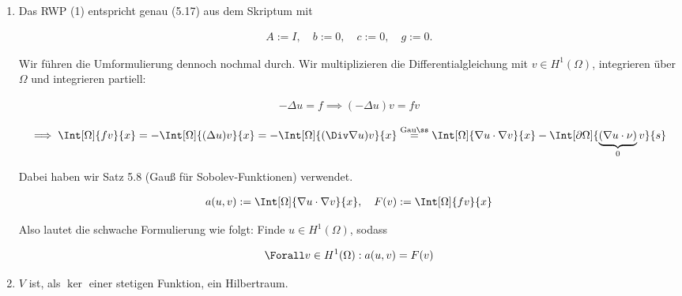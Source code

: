 \begin{solution}

\phantom{}

\begin{enumerate}[label = \alph*)]

    \item Das RWP (1) entspricht genau (5.17) aus dem Skriptum mit

    \begin{align*}
        A := I, \quad b := 0, \quad c := 0, \quad g := 0.
    \end{align*}

    Wir führen die Umformulierung dennoch nochmal durch.
    Wir multiplizieren die Differentialgleichung mit $v \in H^1(\Omega)$, integrieren über $\Omega$ und integrieren partiell:

    \begin{align*}
        -\Delta u = f
        \implies
        (-\Delta u) v = f v
    \end{align*}

    \begin{align*}
        \implies
        \Int[\Omega]{f v}{x}
        =
        -\Int[\Omega]{(\Delta u) v}{x}
        =
        -\Int[\Omega]{(\Div \nabla u) v}{x}
        \stackrel
        {
            \mathrm{Gauß}
        }{=}
        \Int[\Omega]{\nabla u \cdot \nabla v}{x}
        -
        \Int[\partial \Omega]{\underbrace{(\nabla u \cdot \nu)}_0 v}{s}
    \end{align*}

    Dabei haben wir Satz 5.8 (Gauß für Sobolev-Funktionen) verwendet.


    \begin{align*}
        a(u, v) := \Int[\Omega]{\nabla u \cdot \nabla v}{x},
        \quad
        F(v) := \Int[\Omega]{f v}{x}
    \end{align*}

    Also lautet die schwache Formulierung wie folgt:
    Finde $u \in H^1(\Omega)$, sodass

    \begin{align*}
        \Forall v \in H^1(\Omega):
        a(u, v) = F(v)
    \end{align*}

    \item $V$ ist, als $\ker$ einer stetigen Funktion, ein Hilbertraum.


\end{enumerate}
\end{solution}
